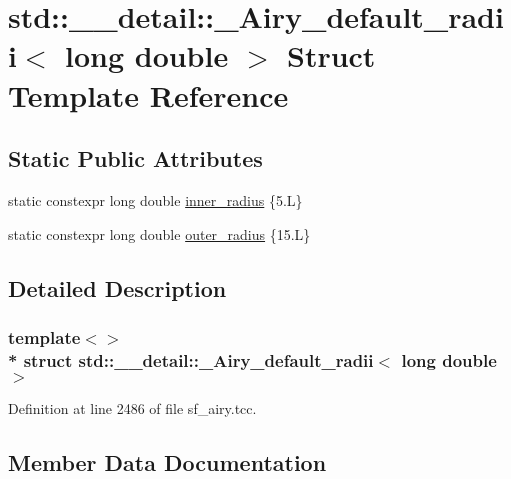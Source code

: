 \hypertarget{structstd_1_1____detail_1_1__Airy__default__radii_3_01long_01double_01_4}{}\section{std\+:\+:\+\_\+\+\_\+detail\+:\+:\+\_\+\+Airy\+\_\+default\+\_\+radii$<$ long double $>$ Struct Template Reference}
\label{structstd_1_1____detail_1_1__Airy__default__radii_3_01long_01double_01_4}
\subsection*{Static Public Attributes}
\begin{DoxyCompactItemize}
\item 
static constexpr long double \hyperlink{structstd_1_1____detail_1_1__Airy__default__radii_3_01long_01double_01_4_a59d4d304728aa4ac3669fc967a9e69a9}{inner\+\_\+radius} \{5.\+L\}
\item 
static constexpr long double \hyperlink{structstd_1_1____detail_1_1__Airy__default__radii_3_01long_01double_01_4_ab46784c2c76dc0f43aeb85d22f8b21a7}{outer\+\_\+radius} \{15.\+L\}
\end{DoxyCompactItemize}


\subsection{Detailed Description}
\subsubsection*{template$<$$>$\\*
struct std\+::\+\_\+\+\_\+detail\+::\+\_\+\+Airy\+\_\+default\+\_\+radii$<$ long double $>$}



Definition at line 2486 of file sf\+\_\+airy.\+tcc.



\subsection{Member Data Documentation}
